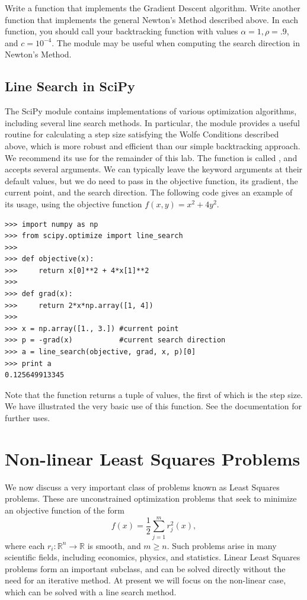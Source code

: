 \begin{problem}
Write a function  that implements the Gradient Descent algorithm.
Write another function  that implements the general Newton's Method
described above. In each function, you should call your backtracking function with
values $\alpha = 1, \rho = .9$, and $c = 10^{-4}$. The  module
may be useful when computing the search direction in Newton's Method.
\end{problem}

\subsection*{Line Search in SciPy}
The SciPy module  contains implementations of various optimization algorithms,
including several line search methods. In particular, the module provides a useful routine for
calculating a step size satisfying the Wolfe Conditions described above, which is more robust
and efficient than our simple backtracking approach. We recommend its use for the remainder of
this lab. The function is called , and accepts several arguments. We can typically
leave the keyword arguments at their default values, but we do need to pass in the objective
function, its gradient, the current point, and the search direction. The following code gives
an example of its usage, using the objective function $f(x, y) = x^2+4y^2$.
\begin{lstlisting}
>>> import numpy as np
>>> from scipy.optimize import line_search
>>>
>>> def objective(x):
>>>     return x[0]**2 + 4*x[1]**2
>>>
>>> def grad(x):
>>>     return 2*x*np.array([1, 4])
>>>
>>> x = np.array([1., 3.]) #current point
>>> p = -grad(x)           #current search direction
>>> a = line_search(objective, grad, x, p)[0]
>>> print a
0.125649913345
\end{lstlisting}
Note that the function returns a tuple of values, the first of which is the step size. We have illustrated
the very basic use of this function. See the documentation for further uses.

\section*{Non-linear Least Squares Problems}
We now discuss a very important class of problems known as Least Squares problems. These
are unconstrained optimization problems that seek to minimize an objective function of the form
$$
f(x) = \frac{1}{2}\displaystyle\sum_{j=1}^m r_j^2(x),
$$
where each $r_i : \mathbb{R}^n \rightarrow \mathbb{R}$ is smooth, and $m \geq n$. Such problems
arise in many scientific fields, including economics, physics, and statistics. Linear Least
Squares problems form an important subclass, and can be solved directly without the need for an
iterative method. At present we will focus on the non-linear case, which can be solved with a
line search method.

